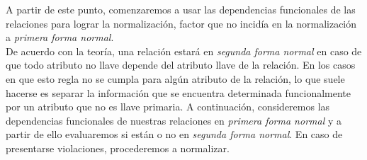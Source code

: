 \documentclass[11pt,letterpaper]{article}
\begin{document}
A partir de este punto, comenzaremos a usar las dependencias funcionales de las relaciones para lograr la normalización, factor que no incidía en la normalización a \textit{primera forma normal}. \\

De acuerdo con la teoría, una relación estará en \textit{segunda forma normal} en caso de que todo atributo no llave depende del atributo llave de la relación. En los casos en que esto regla no se cumpla para algún atributo de la relación, lo que suele hacerse es separar la información que se encuentra determinada funcionalmente por un atributo que no es llave primaria. A continuación, consideremos las dependencias funcionales de nuestras relaciones en \textit{primera forma normal} y a partir de ello evaluaremos si están o no en \textit{segunda forma normal}. En caso de presentarse violaciones, procederemos a normalizar.
\end{document}
